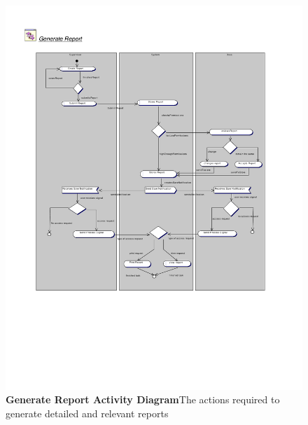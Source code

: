 \documentclass[letterpaper,12pt]{report}
\begin{document}
\begin{figure}[activity_genrep]
 \includegraphics[trim=20mm 70mm 25mm 15mm]{diagrams/ad_gen1.pdf}
 \caption{\small
\textbf{Generate Report Activity Diagram}\newline The actions required to generate detailed and relevant reports}\label{fig:act2}
\end{figure}
\newpage
\end{document}
